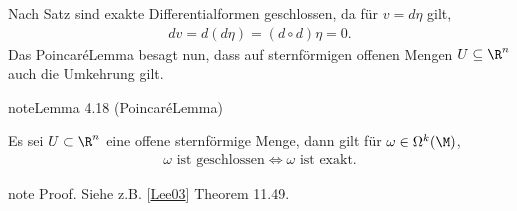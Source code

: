 \documentclass[letterpaper,10pt,english]{jupyterBook}
\begin{document}
\sphinxAtStartPar
Nach Satz  sind exakte Differentialformen geschlossen, da für \(v=d\eta\) gilt,
\begin{equation*}
\begin{split}dv = d(d\eta) = (d\circ d)\eta = 0.\end{split}
\end{equation*}
\sphinxAtStartPar
Das Poincaré\sphinxhyphen{}Lemma besagt nun, dass auf sternförmigen offenen Mengen \(U\subseteq \R^n\) auch die Umkehrung gilt.
\label{manifolds/diffformen:lemma-11}
\begin{sphinxadmonition}{note}{Lemma 4.18 (Poincaré\sphinxhyphen{}Lemma)}



\sphinxAtStartPar
Es sei \(U\subset\R^n\) eine offene sternförmige Menge, dann gilt für \(\omega\in \Omega^k(\M)\),
\begin{equation*}
\begin{split}\omega\text{ ist geschlossen}\Leftrightarrow \omega\text{ ist exakt.}\end{split}
\end{equation*}\end{sphinxadmonition}

\begin{sphinxadmonition}{note}
\sphinxAtStartPar
Proof. Siehe z.B. {[}\hyperlink{cite.references:id15}{Lee03}{]} Theorem 11.49.
\end{sphinxadmonition}
\end{document}
